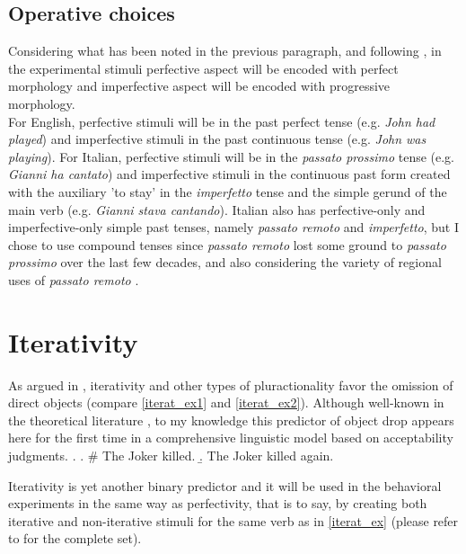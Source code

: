\subsection{Operative choices}
Considering what has been noted in the previous paragraph, and following \textcite{Medina2007}, in the experimental stimuli perfective aspect will be encoded with perfect morphology and imperfective aspect will be encoded with progressive morphology.\\
For English, perfective stimuli will be in the past perfect tense (e.g. \textit{John had played}) and imperfective stimuli in the past continuous tense (e.g. \textit{John was playing}). For Italian, perfective stimuli will be in the \textit{passato prossimo} tense (e.g. \textit{Gianni ha cantato}) and imperfective stimuli in the continuous past form created with the auxiliary 'to stay' in the \textit{imperfetto} tense and the simple gerund of the main verb (e.g. \textit{Gianni stava cantando}). Italian also has perfective-only and imperfective-only simple past tenses, namely \textit{passato remoto} and \textit{imperfetto}, but I chose to use compound tenses since \textit{passato remoto} lost some ground to \textit{passato prossimo} over the last few decades, and also considering the variety of regional uses of \textit{passato remoto} \parencite{bertinetto1996distribuzione}.

\section{Iterativity} 

As argued in , iterativity and other types of pluractionality favor the omission of direct objects (compare \ref{iterat_ex1} and \ref{iterat_ex2}). Although well-known in the theoretical literature \parencite{Glass2013, Glass2020, Ruda2017}, to my knowledge this predictor of object drop appears here for the first time in a comprehensive linguistic model based on acceptability judgments.
\ex.\label{iterat_ex} \a. \# The Joker killed. \label{iterat_ex1} 
\b. The Joker killed again. \label{iterat_ex2}

Iterativity is yet another binary predictor and it will be used in the behavioral experiments in the same way as perfectivity, that is to say, by creating both iterative and non-iterative stimuli for the same verb as in \ref{iterat_ex} (please refer to  for the complete set).

